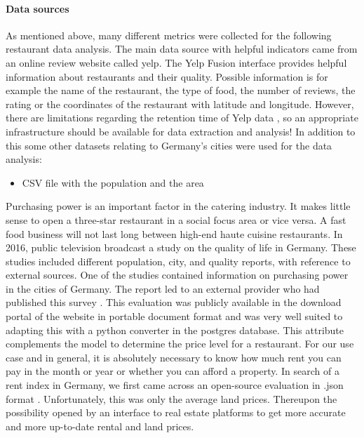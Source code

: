 \paragraph{Data sources}
\label{subsec:Data sources}
As mentioned above, many different metrics were collected for the following restaurant data analysis. The main data source with helpful indicators came from an online review website called yelp. The Yelp Fusion interface provides helpful information about restaurants and their quality. Possible information is for example the name of the restaurant, the type of food, the number of reviews, the rating or the coordinates of the restaurant with latitude and longitude. However, there are limitations regarding the retention time of Yelp data \cite{Yelp}, so an appropriate infrastructure should be available for data extraction and analysis!
\newline
In addition to this some other datasets relating to Germany's cities were used for the data analysis:
\begin{itemize}
\item CSV file with the population and the area
\end{itemize}

Purchasing power is an important factor in the catering industry. It makes little sense to open a three-star restaurant in a social focus area or vice versa. A fast food business will not last long between high-end haute cuisine restaurants. In 2016, public television broadcast a study on the quality of life in Germany. These studies included different population, city, and quality reports, with reference to external sources. One of the studies contained information on purchasing power in the cities of Germany. The report led to an external provider who had published this survey \cite{BuyingPower}. This evaluation was publicly available in the download portal of the website in portable document format and was very well suited to adapting this with a python converter in the postgres database. This attribute complements the model to determine the price level for a restaurant.
\newline
For our use case and in general, it is absolutely necessary to know how much rent you can pay in the month or year or whether you can afford a property. In search of a rent index in Germany, we first came across an open-source evaluation in .json format \cite{Sparda}. Unfortunately, this was only the average land prices. Thereupon the possibility opened by an interface to real estate platforms \cite{ImmoScout} to get more accurate and more up-to-date rental and land prices.
